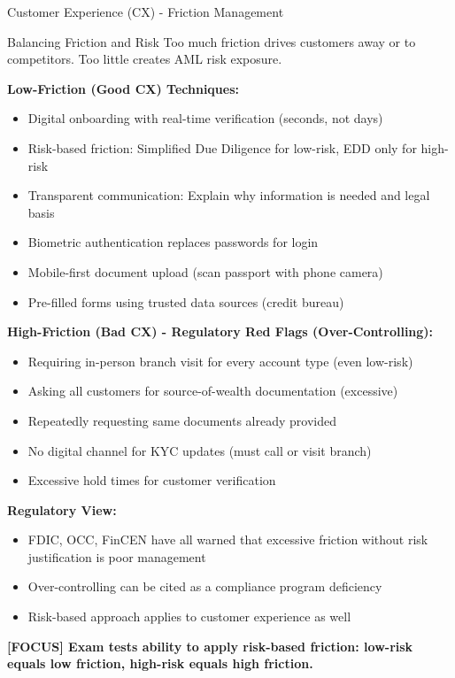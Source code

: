 \documentclass[11pt,a4paper]{beamer}
\newcommand{\examfocus}[1]{\textcolor{orange!80!black}{\textbf{[FOCUS] #1}}}
\begin{document}
	\begin{frame}{Customer Experience (CX) - Friction Management}
		\begin{block}{Balancing Friction and Risk}
			Too much friction drives customers away or to competitors. Too little creates AML risk exposure.
		\end{block}
		
		\textbf{Low-Friction (Good CX) Techniques:}
		\begin{itemize}
			\item Digital onboarding with real-time verification (seconds, not days)
			\item Risk-based friction: Simplified Due Diligence for low-risk, EDD only for high-risk
			\item Transparent communication: Explain why information is needed and legal basis
			\item Biometric authentication replaces passwords for login
			\item Mobile-first document upload (scan passport with phone camera)
			\item Pre-filled forms using trusted data sources (credit bureau)
		\end{itemize}
		
		\textbf{High-Friction (Bad CX) - Regulatory Red Flags (Over-Controlling):}
		\begin{itemize}
			\item Requiring in-person branch visit for every account type (even low-risk)
			\item Asking all customers for source-of-wealth documentation (excessive)
			\item Repeatedly requesting same documents already provided
			\item No digital channel for KYC updates (must call or visit branch)
			\item Excessive hold times for customer verification
		\end{itemize}
		
		\textbf{Regulatory View:}
		\begin{itemize}
			\item FDIC, OCC, FinCEN have all warned that excessive friction without risk justification is poor management
			\item Over-controlling can be cited as a compliance program deficiency
			\item Risk-based approach applies to customer experience as well
		\end{itemize}
		
		\examfocus{Exam tests ability to apply risk-based friction: low-risk equals low friction, high-risk equals high friction.}
	\end{frame}
	
\end{document}
